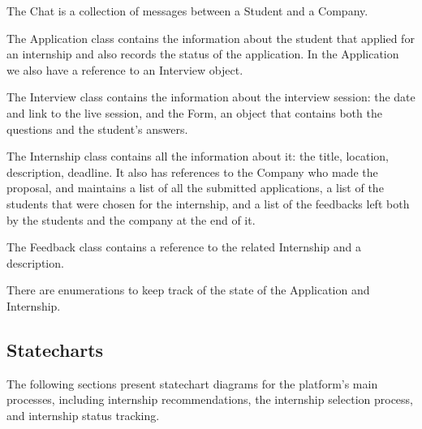 The Chat is a collection of messages between a Student and a Company.

The Application class contains the information about the student that applied for an internship and also records the status of the application. In the
Application we also have a reference to an Interview object.

The Interview class contains the information about the interview session: the date and link to the live session, and the Form, an object that contains 
both the questions and the student's answers.

The Internship class contains all the information about it: the title, location, description, deadline. It also has references to the Company who made 
the proposal, and maintains a list of all the submitted applications, a list of the students that were chosen for the internship, and a list of
the feedbacks left both by the students and the company at the end of it.

The Feedback class contains a reference to the related Internship and a description.

There are enumerations to keep track of the state of the Application and Internship.

\subsection{Statecharts}\label{subsec:statecharts}
The following sections present statechart diagrams for the platform's main processes, including internship recommendations, the internship 
selection process, and internship status tracking. 

